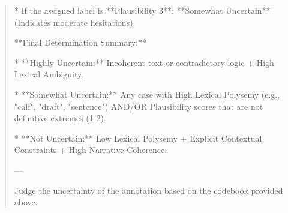 \begin{quote}
    *   If the assigned label is **Plausibility 3**: **Somewhat Uncertain** (Indicates moderate hesitations).



**Final Determination Summary:**

*   **Highly Uncertain:** Incoherent text or contradictory logic + High Lexical Ambiguity.

*   **Somewhat Uncertain:** Any case with High Lexical Polysemy (e.g., "calf", "draft", "sentence") AND/OR Plausibility scores that are not definitive extremes (1-2).

*   **Not Uncertain:** Low Lexical Polysemy + Explicit Contextual Constraints + High Narrative Coherence.



---

Judge the uncertainty of the annotation based on the codebook provided above.
\end{quote}
